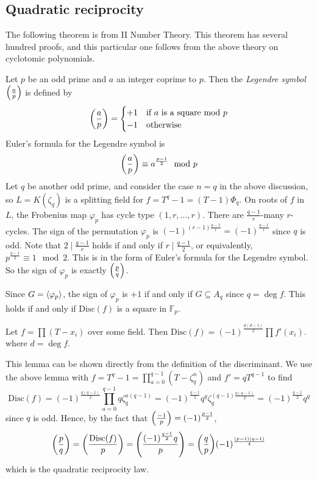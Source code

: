 \subsection{Quadratic reciprocity}
The following theorem is from II Number Theory.
This theorem has several hundred proofs, and this particular one follows from the above theory on cyclotomic polynomials.

Let \( p \) be an odd prime and \( a \) an integer coprime to \( p \).
Then the \emph{Legendre symbol} \( \qty(\frac a p) \) is defined by
\[ \qty(\frac a p) = \begin{cases}
	+1 & \text{if } a \text{ is a square mod } p \\
	-1 & \text{otherwise}
\end{cases} \]
Euler's formula for the Legendre symbol is
\[ \qty(\frac a p) \equiv a^{\frac{p-1}{2}} \mod p \]
Let \( q \) be another odd prime, and consider the case \( n = q \) in the above discussion, so \( L = K(\zeta_q) \) is a splitting field for \( f = T^q - 1 = (T - 1) \Phi_q \).
On roots of \( f \) in \( L \), the Frobenius map \( \varphi_p \) has cycle type \( (1, r, \dots, r) \).
There are \( \frac{q-1}{r} \)-many \( r \)-cycles.
The sign of the permutation \( \varphi_p \) is \( (-1)^{(r-1) \frac{q-1}{r}} = (-1)^{\frac{q-1}{r}} \) since \( q \) is odd.
Note that \( 2 \mid \frac{q-1}{r} \) holds if and only if \( r \mid \frac{q-1}{2} \), or equivalently, \( p^{\frac{q-1}{2}} \equiv 1 \mod 2 \).
This is in the form of Euler's formula for the Legendre symbol.
So the sign of \( \varphi_p \) is exactly \( \qty(\frac p q) \).

Since \( G = \left\langle{} \varphi_p \right\rangle \), the sign of \( \varphi_p \) is \( +1 \) if and only if \( G \subseteq A_q \) since \( q = \deg f \).
This holds if and only if \( \mathrm{Disc}(f) \) is a square in \( \mathbb F_p \).
\begin{lemma}
	Let \( f = \prod (T - x_i) \) over some field.
	Then \( \mathrm{Disc}(f) = (-1)^{\frac{d(d-1)}{2}} \prod f'(x_i) \).
	where \( d = \deg f \).
\end{lemma}
This lemma can be shown directly from the definition of the discriminant.
We use the above lemma with \( f = T^q - 1 = \prod_{a=0}^{q-1}(T - \zeta_q^n) \) and \( f' = qT^{q-1} \) to find
\[ \mathrm{Disc}(f) = (-1)^{\frac{q(q-1)}{2}} \prod_{a=0}^{q-1} q \zeta_q^{a(q-1)} = (-1)^{\frac{q-1}{2}} q^q \zeta_q^{(q-1)\frac{q(q-1)}{2}} = (-1)^{\frac{q-1}{2}} q^q \]
since \( q \) is odd.
Hence, by the fact that \( \qty(\frac{-1}{p}) = (-1)^{\frac{p-1}{2}} \),
\[ \qty(\frac p q) = \qty(\frac{\mathrm{Disc}(f)}{p}) = \qty(\frac{(-1)^{\frac{q-1}{2}}q}{p}) = \qty(\frac{q}{p}) (-1)^{\frac{(p-1)(q-1)}{4}} \]
which is the quadratic reciprocity law.

